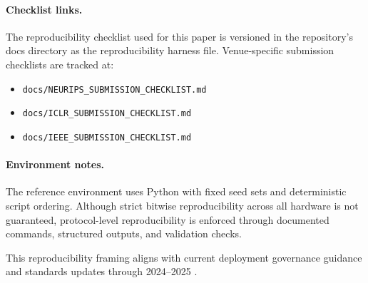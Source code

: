 \paragraph{Checklist links.}
The reproducibility checklist used for this paper is versioned in the repository's docs directory as the reproducibility harness file.
Venue-specific submission checklists are tracked at:
\begin{itemize}
    \item \texttt{docs/NEURIPS\_SUBMISSION\_CHECKLIST.md}
    \item \texttt{docs/ICLR\_SUBMISSION\_CHECKLIST.md}
    \item \texttt{docs/IEEE\_SUBMISSION\_CHECKLIST.md}
\end{itemize}

\paragraph{Environment notes.}
The reference environment uses Python with fixed seed sets and deterministic script ordering. Although strict bitwise reproducibility across all hardware is not guaranteed, protocol-level reproducibility is enforced through documented commands, structured outputs, and validation checks.

This reproducibility framing aligns with current deployment governance guidance and standards updates through 2024--2025 \citep{nistairmf2023,nistcsf2024}.
